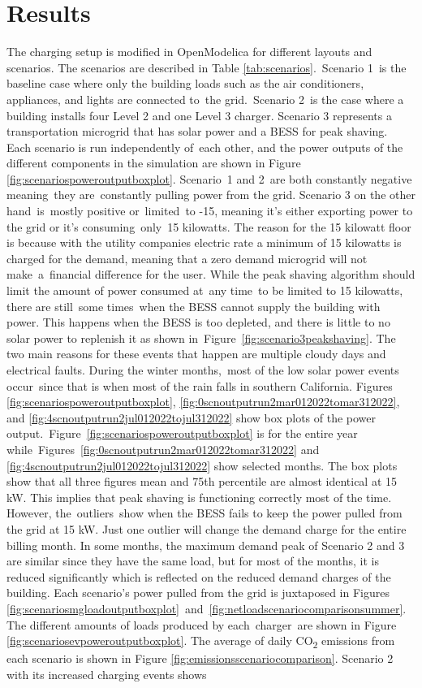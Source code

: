 \documentclass[conference]{IEEEtran}
\begin{document}
\section{Results}
	The charging setup is modified in OpenModelica for different layouts and scenarios. The scenarios are described in Table \ref{tab:scenarios}. Scenario 1 is the baseline case where only the building loads such as the air conditioners, appliances, and lights are connected to the grid. Scenario 2 is the case where a building installs four Level 2 and one Level 3 charger. Scenario 3 represents a transportation microgrid that has solar power and a BESS for peak shaving. Each scenario is run independently of each other, and the power outputs of the different components in the simulation are shown in Figure \ref{fig:scenariospoweroutputboxplot}. Scenario 1 and 2 are both constantly negative meaning they are constantly pulling power from the grid. Scenario 3 on the other hand is mostly positive or limited to -15, meaning it’s either exporting power to the grid or it’s consuming only 15 kilowatts. The reason for the 15 kilowatt floor is because with the utility companies electric rate a minimum of 15 kilowatts is charged for the demand, meaning that a zero demand microgrid will not make a financial difference for the user. While the peak shaving algorithm should limit the amount of power consumed at any time to be limited to 15 kilowatts, there are still some times when the BESS cannot supply the building with power. This happens when the BESS is too depleted, and there is little to no solar power to replenish it as shown in Figure \ref{fig:scenario3peakshaving}. The two main reasons for these events that happen are multiple cloudy days and electrical faults. During the winter months, most of the low solar power events occur since that is when most of the rain falls in southern California. Figures \ref{fig:scenariospoweroutputboxplot}, \ref{fig:0scnoutputrun2mar012022tomar312022}, and \ref{fig:4scnoutputrun2jul012022tojul312022} show box plots of the power output. Figure \ref{fig:scenariospoweroutputboxplot} is for the entire year while Figures \ref{fig:0scnoutputrun2mar012022tomar312022} and \ref{fig:4scnoutputrun2jul012022tojul312022} show selected months. The box plots show that all three figures mean and 75th percentile are almost identical at 15 kW. This implies that peak shaving is functioning correctly most of the time. However, the outliers show when the BESS fails to keep the power pulled from the grid at 15 kW. Just one outlier will change the demand charge for the entire billing month. In some months, the maximum demand peak of Scenario 2 and 3 are similar since they have the same load, but for most of the months, it is reduced significantly which is reflected on the reduced demand charges of the building. Each scenario’s power pulled from the grid is juxtaposed in Figures \ref{fig:scenariosmgloadoutputboxplot} and \ref{fig:netloadscenariocomparisonsummer}. The different amounts of loads produced by each charger are shown in Figure \ref{fig:scenariosevpoweroutputboxplot}. The average of daily CO\textsubscript{2} emissions from each scenario is shown in Figure \ref{fig:emissionsscenariocomparison}. Scenario 2 with its increased charging events shows 
\end{document}

